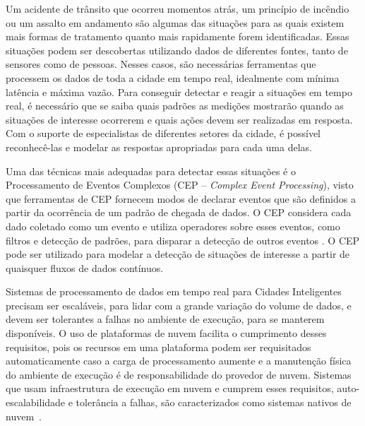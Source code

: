 Um acidente de trânsito que ocorreu momentos atrás, um princípio de incêndio ou um assalto em andamento são algumas das situações para as quais existem mais formas de tratamento quanto mais rapidamente forem identificadas. Essas situações podem ser descobertas utilizando dados de diferentes fontes, tanto de sensores como de pessoas. 
Nesses casos, são necessárias ferramentas que processem os dados de toda a cidade em tempo real, idealmente com mínima latência e máxima vazão. Para conseguir detectar e reagir a situações em tempo real, é necessário que se saiba quais padrões as medições mostrarão quando as situações de interesse ocorrerem e quais ações devem ser realizadas em resposta. Com o suporte de especialistas de diferentes setores da cidade, é possível reconhecê-las e modelar as respostas apropriadas para cada uma delas.




Uma das técnicas mais adequadas para detectar essas situações é o Processamento de Eventos Complexos (CEP – \textit{Complex Event Processing}), visto que ferramentas de CEP fornecem modos de declarar eventos que são definidos a partir da ocorrência de um padrão de chegada de dados. O CEP considera cada dado coletado como um evento e utiliza operadores sobre esses eventos, como filtros e detecção de padrões, para disparar a detecção de outros eventos \citep{Etzion:2010:EPA:1894960}.
O CEP pode ser utilizado para modelar a detecção de situações de interesse a partir de quaisquer fluxos de dados contínuos. 

Sistemas de processamento de dados em tempo real para Cidades Inteligentes precisam ser escaláveis, para lidar com a grande variação do volume de dados, e devem ser tolerantes a falhas no ambiente de execução, para se manterem disponíveis. O uso de plataformas de nuvem facilita o cumprimento desses requisitos, pois os recursos em uma plataforma podem ser requisitados automaticamente caso a carga de processamento aumente e a manutenção física do ambiente de execução é de responsabilidade do provedor de nuvem. Sistemas que usam infraestrutura de execução em nuvem e cumprem esses requisitos, auto-escalabilidade e tolerância a falhas, são caracterizados como sistemas nativos de nuvem~\citep{garrison2017cloud}.

